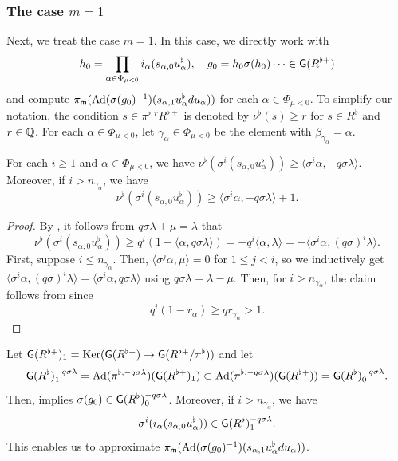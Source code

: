 \documentclass[12pt,reqno]{amsart}
\begin{document}
\subsubsection{The case $m = 1$}

Next, we treat the case $m = 1$. In this case, we directly work with 
\[
    h_0 = \prod_{\alpha \in \Phi_{\mu < 0}} i_\alpha(s_{\alpha, 0} u_\alpha^\flat) , \quad g_0 = h_0 \sigma(h_0) \cdots \in {\mathsf{G}}(R^{\flat +})
\]
and compute $\pi_{{\mathsf{m}}}({\operatorname{Ad}}(\sigma(g_0)^{-1})(s_{\alpha, 1} u_\alpha^\flat du_\alpha))$ for each $\alpha \in \Phi_{\mu < 0}$. To simplify our notation, the condition $s \in \pi^{\flat, r} R^{\flat +}$ is denoted by $\nu^\flat(s) \geq r$ for $s \in R^\flat$ and $r \in \mathbb{Q}$. For each $\alpha \in \Phi_{\mu < 0}$, let $\gamma_\alpha \in \Phi_{\mu < 0}$ be the element with $\beta_{\gamma_\alpha} = \alpha$. 

\begin{lem} \label{lem:val_alpha_s_alpha}
    For each $i \geq 1$ and $\alpha \in \Phi_{\mu < 0}$, we have $\nu^\flat(\sigma^i(s_{\alpha, 0} u_\alpha^\flat)) \geq \langle \sigma^i \alpha, -q \sigma \lambda \rangle$. Moreover, if $i > n_{\gamma_\alpha}$, we have
    \[
        \nu^\flat(\sigma^i(s_{\alpha, 0} u_\alpha^\flat)) \geq \langle \sigma^i \alpha, -q \sigma \lambda \rangle + 1. 
    \]
\end{lem}
\begin{proof}
    By , it follows from $q\sigma \lambda + \mu = \lambda$ that 
    \[
        \nu^\flat(\sigma^i(s_{\alpha, 0} u_\alpha^\flat)) \geq q^i (1 - \langle \alpha, q \sigma \lambda \rangle) = - q^i \langle \alpha, \lambda \rangle = - \langle \sigma^i \alpha, (q\sigma)^i \lambda \rangle. 
    \]
    First, suppose $i \leq n_{\gamma_\alpha}$. Then, $\langle \sigma^j \alpha, \mu \rangle = 0$ for $1 \leq j < i$, so we inductively get $\langle \sigma^i \alpha, (q\sigma)^i \lambda \rangle = \langle \sigma^i \alpha, q\sigma \lambda \rangle$ using $q\sigma \lambda = \lambda - \mu$. Then, for $i > n_{\gamma_\alpha}$, the claim follows from  since 
    \[
        q^i (1 - r_\alpha) \geq q r_{\gamma_\alpha} > 1. 
    \]
    \vspace{-\topsep}
\end{proof}

Let ${\mathsf{G}}(R^{\flat +})_1 = {\operatorname{Ker}}({\mathsf{G}}(R^{\flat +}) \to {\mathsf{G}}(R^{\flat +} / \pi^\flat))$ and let
\[
    {\mathsf{G}}(R^{\flat})^{-q \sigma \lambda}_1 = {\operatorname{Ad}}(\pi^{\flat, -q \sigma \lambda})({\mathsf{G}}(R^{\flat +})_1) \subset {\operatorname{Ad}}(\pi^{\flat, -q \sigma \lambda})({\mathsf{G}}(R^{\flat +})) = {\mathsf{G}}(R^{\flat})^{-q \sigma \lambda}_0. 
\]
Then,  implies $\sigma(g_0) \in {\mathsf{G}}(R^{\flat})_0^{-q \sigma \lambda}$. Moreover, if $i > n_{\gamma_\alpha}$, we have 
\[
    \sigma^i(i_\alpha(s_{\alpha, 0} u_\alpha^\flat)) \in {\mathsf{G}}(R^{\flat})^{-q \sigma \lambda}_1. 
\]
This enables us to approximate $\pi_{{\mathsf{m}}}({\operatorname{Ad}}(\sigma(g_0)^{-1})(s_{\alpha, 1} u_\alpha^\flat du_\alpha))$. 
\end{document}

